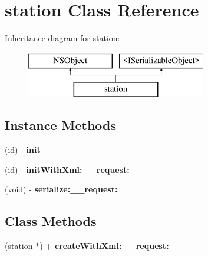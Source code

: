 \hypertarget{interfacestation}{}\section{station Class Reference}
\label{interfacestation}
Inheritance diagram for station\+:\begin{figure}[H]
\begin{center}
\leavevmode
\includegraphics[height=2.000000cm]{interfacestation}
\end{center}
\end{figure}
\subsection*{Instance Methods}
\begin{DoxyCompactItemize}
\item 
\hypertarget{interfacestation_a280c69a7a984209357fe5045f836578b}{}(id) -\/ {\bfseries init}\label{interfacestation_a280c69a7a984209357fe5045f836578b}

\item 
\hypertarget{interfacestation_a9d9e0273b9d71cd1e676b5ee78810077}{}(id) -\/ {\bfseries init\+With\+Xml\+:\+\_\+\+\_\+request\+:}\label{interfacestation_a9d9e0273b9d71cd1e676b5ee78810077}

\item 
\hypertarget{interfacestation_a03506466241762ef0d69b64e39922570}{}(void) -\/ {\bfseries serialize\+:\+\_\+\+\_\+request\+:}\label{interfacestation_a03506466241762ef0d69b64e39922570}

\end{DoxyCompactItemize}
\subsection*{Class Methods}
\begin{DoxyCompactItemize}
\item 
\hypertarget{interfacestation_a9663ee042b13b0e3fac3e48cc8dab703}{}(\hyperlink{interfacestation}{station} $\ast$) + {\bfseries create\+With\+Xml\+:\+\_\+\+\_\+request\+:}\label{interfacestation_a9663ee042b13b0e3fac3e48cc8dab703}

\end{DoxyCompactItemize}
